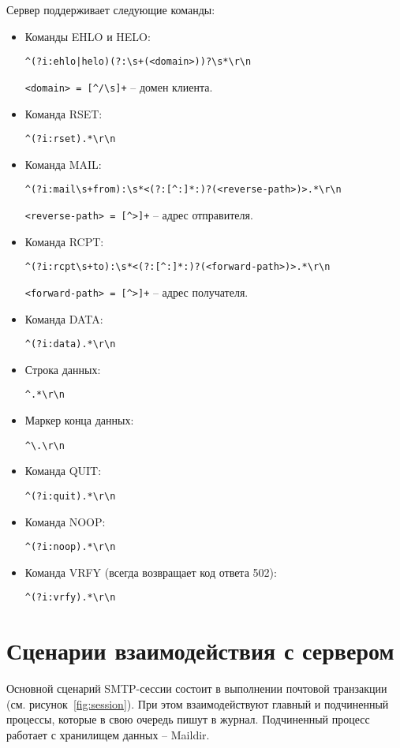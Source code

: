 Сервер поддерживает следующие команды:
\begin{itemize}
\item Команды EHLO и HELO:

\verb;^(?i:ehlo|helo)(?:\s+(<domain>))?\s*\r\n;

\verb;<domain> = [^/\s]+; -- домен клиента.

\item Команда RSET:

\verb;^(?i:rset).*\r\n;

\item Команда MAIL:

\verb;^(?i:mail\s+from):\s*<(?:[^:]*:)?(<reverse-path>)>.*\r\n;

\verb;<reverse-path> = [^>]+; -- адрес отправителя.

\item Команда RCPT:

\verb;^(?i:rcpt\s+to):\s*<(?:[^:]*:)?(<forward-path>)>.*\r\n;

\verb;<forward-path> = [^>]+; -- адрес получателя.

\item Команда DATA:

\verb;^(?i:data).*\r\n;

\item Строка данных:

\verb;^.*\r\n;

\item Маркер конца данных:

\verb;^\.\r\n;

\item Команда QUIT:

\verb;^(?i:quit).*\r\n;

\item Команда NOOP:

\verb;^(?i:noop).*\r\n;

\item Команда VRFY (всегда возвращает код ответа 502):

\verb;^(?i:vrfy).*\r\n;

\end{itemize}

\section{Сценарии взаимодействия с сервером}

Основной сценарий SMTP-сессии состоит в выполнении почтовой транзакции (см. рисунок~\ref{fig:session}).
При этом взаимодействуют главный и подчиненный процессы, которые в свою очередь пишут в журнал.
Подчиненный процесс работает с хранилищем данных -- Maildir.

